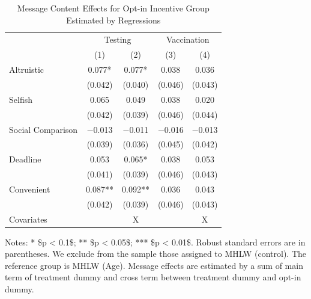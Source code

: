 \documentclass[
]{article}
\begin{document}
\begin{table}

\caption{\label{tab:lh-int-woA}Message Content Effects for Opt-in Incentive Group Estimated by Regressions}
\centering
\fontsize{9}{11}\selectfont
\begin{threeparttable}
\begin{tabular}[t]{lcccc}
\toprule
\multicolumn{1}{c}{ } & \multicolumn{2}{c}{Testing} & \multicolumn{2}{c}{Vaccination} \\
\cmidrule(l{3pt}r{3pt}){2-3} \cmidrule(l{3pt}r{3pt}){4-5}
  & (1) & (2) & (3) & (4)\\
\midrule
Altruistic & \num{0.077}* & \num{0.077}* & \num{0.038} & \num{0.036}\\
 & (\num{0.042}) & (\num{0.040}) & (\num{0.046}) & (\num{0.043})\\
Selfish & \num{0.065} & \num{0.049} & \num{0.038} & \num{0.020}\\
 & (\num{0.042}) & (\num{0.039}) & (\num{0.046}) & (\num{0.044})\\
Social Comparison & \num{-0.013} & \num{-0.011} & \num{-0.016} & \num{-0.013}\\
 & (\num{0.039}) & (\num{0.036}) & (\num{0.045}) & (\num{0.042})\\
Deadline & \num{0.053} & \num{0.065}* & \num{0.038} & \num{0.053}\\
 & (\num{0.041}) & (\num{0.039}) & (\num{0.046}) & (\num{0.043})\\
Convenient & \num{0.087}** & \num{0.092}** & \num{0.036} & \num{0.043}\\
 & (\num{0.042}) & (\num{0.039}) & (\num{0.046}) & (\num{0.043})\\
Covariates &  & X &  & X\\
\bottomrule
\end{tabular}
\begin{tablenotes}
\item Notes: * \$p < 0.1\$; ** \$p < 0.05\$; *** \$p < 0.01\$. Robust standard errors are in parentheses. We exclude from the sample those assigned to MHLW (control). The reference group is MHLW (Age). Message effects are estimated by a sum of main term of treatment dummy and cross term between treatment dummy and opt-in dummy.
\end{tablenotes}
\end{threeparttable}
\end{table}
\end{document}
